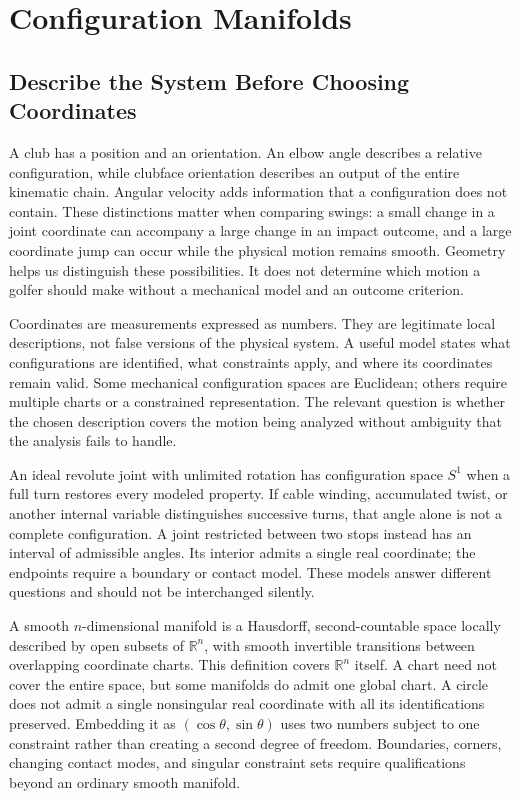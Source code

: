 \chapter{Configuration Manifolds}
\label{ch:configuration_manifolds}

\section{Describe the System Before Choosing Coordinates}

A club has a position and an orientation. An elbow angle describes a relative
configuration, while clubface orientation describes an output of the entire
kinematic chain. Angular velocity adds information that a configuration does
not contain. These distinctions matter when comparing swings: a small change
in a joint coordinate can accompany a large change in an impact outcome, and
a large coordinate jump can occur while the physical motion remains smooth.
Geometry helps us distinguish these possibilities. It does not determine which
motion a golfer should make without a mechanical model and an outcome criterion.

Coordinates are measurements expressed as numbers. They are legitimate local
descriptions, not false versions of the physical system. A useful model states
what configurations are identified, what constraints apply, and where its
coordinates remain valid. Some mechanical configuration spaces are Euclidean;
others require multiple charts or a constrained representation. The relevant
question is whether the chosen description covers the motion being analyzed
without ambiguity that the analysis fails to handle.

An ideal revolute joint with unlimited rotation has configuration space $S^1$
when a full turn restores every modeled property. If cable winding, accumulated
twist, or another internal variable distinguishes successive turns, that angle
alone is not a complete configuration. A joint restricted between two stops
instead has an interval of admissible angles. Its interior admits a single
real coordinate; the endpoints require a boundary or contact model. These
models answer different questions and should not be interchanged silently.

A smooth $n$-dimensional manifold is a Hausdorff, second-countable space locally
described by open subsets of $\mathbb R^n$, with smooth invertible transitions
between overlapping coordinate charts. This definition covers $\mathbb R^n$
itself. A chart need not cover the entire space, but some manifolds do admit one
global chart. A circle does not admit a single nonsingular real coordinate
with all its identifications preserved. Embedding it as $(\cos\theta,\sin\theta)$
uses two numbers subject to one constraint rather than creating a second
degree of freedom. Boundaries, corners, changing contact modes, and singular
constraint sets require qualifications beyond an ordinary smooth manifold.

